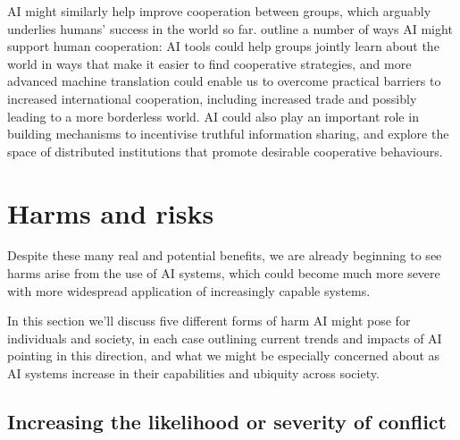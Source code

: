 \documentclass{article}
\begin{document}
AI might similarly help improve cooperation between groups, which arguably underlies humans’ success in the world so far. \citet{dafoe_open_2020} outline a number of ways AI might support human cooperation: AI tools could help groups jointly learn about the world in ways that make it easier to find cooperative strategies, and more advanced machine translation could enable us to overcome practical barriers to increased international cooperation, including increased trade and possibly leading to a more borderless world. AI could also play an important role in building mechanisms to incentivise truthful information sharing, and explore the space of distributed institutions that promote desirable cooperative behaviours.

\section{Harms and risks}

Despite these many real and potential benefits, we are already beginning to see harms arise from the use of AI systems, which could become much more severe with more widespread application of increasingly capable systems.

In this section we’ll discuss five different forms of harm AI might pose for individuals and society, in each case outlining current trends and impacts of AI pointing in this direction, and what we might be especially concerned about as AI systems increase in their capabilities and ubiquity across society.

\subsection{Increasing the likelihood or severity of conflict}
\end{document}
